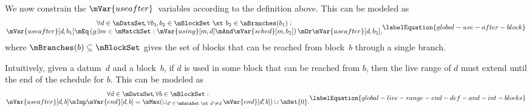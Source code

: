 We now constrain the $\mVar{useafter}$~\glspl{variable} according to the
definition above.
%
This can be modeled as
%
\begin{equation}
  \begin{array}{@{}c@{}}
    \forall d \in \mDataSet \!,
    \forall b_1 \hspace{-1pt}, b_2 \in \mBlockSet
    \text{ \st }
    b_2 \in \mBranches(b_1) : \\
    \mVar{useafter}[d \hspace{-.8pt}, b_1]
    \mEq
    \left(g
      \exists m \in \mMatchSet :
      \mVar{using}[m \hspace{-.8pt}, d]
      \mAnd
      \mVar{sched}[m \hspace{-.8pt}, b_2]
    \right)
    \mOr
    \mVar{useafter}[d \hspace{-.8pt}, b_2],
  \end{array}
  \labelEquation{global-use-after-block}
\end{equation}
%
where \mbox{$\mBranches(b) \subseteq \mBlockSet$} gives the set of \glspl{block}
that can be reached from \gls{block}~$b$ through a single branch.

Intuitively, given a \gls{datum}~$d$ and a \gls{block}~$b$\hspace{-1pt}, if $d$
is used in some \gls{block} that can be reached from $b$\hspace{-1pt}, then the
\gls{live range} of $d$ must extend until the end of the schedule for
$b$\hspace{-1pt}.
%
This can be modeled as
%
\begin{equation}
  \begin{array}{@{}c@{}}
    \forall d \in \mDataSet \!,
    \forall b \in \mBlockSet : \\
    \mVar{useafter}[d \hspace{-.8pt}, b]
    \mImp
    \mVar{end}[d \hspace{-.8pt}, b]
    =
    \mMax(
      \cup_{d' \,\in\, \mDataSet \text{ \st } d' \neq d} \,
      \mVar{end}[d' \!\!, b]
    )
    \cup \mSet{0}.
  \end{array}
  \labelEquation{global-live-range-end-def-and-int-blocks}
\end{equation}

